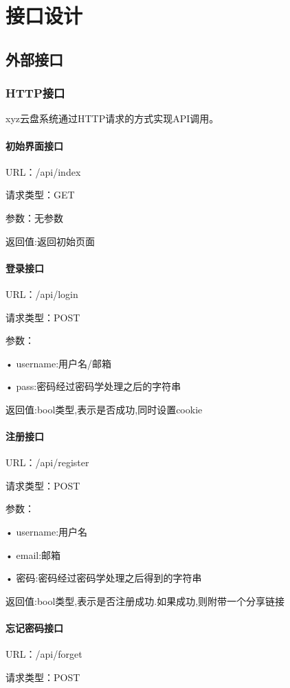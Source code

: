 \chapter{接口设计}
\section{外部接口}

\subsection{HTTP接口}
xyz云盘系统通过HTTP请求的方式实现API调用。

\subsubsection{初始界面接口}
URL：/api/index

请求类型：GET

参数：无参数
 
返回值:返回初始页面

\subsubsection{登录接口}
URL：/api/login

请求类型：POST

参数：

• username:用户名/邮箱

• pass:密码经过密码学处理之后的字符串
 
返回值:bool类型,表示是否成功,同时设置cookie

\subsubsection{注册接口}
URL：/api/register

请求类型：POST

参数：

• username:用户名

• email:邮箱

• 密码:密码经过密码学处理之后得到的字符串

返回值:bool类型,表示是否注册成功.如果成功,则附带一个分享链接

\subsubsection{忘记密码接口}
URL：/api/forget

请求类型：POST

